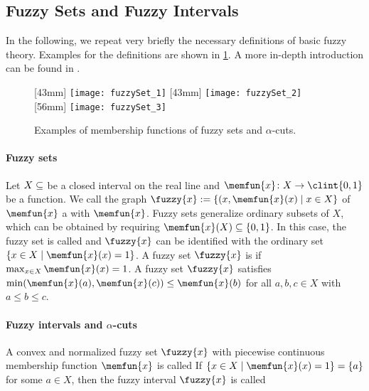 \subsection{Fuzzy Sets and Fuzzy Intervals}
\label{sec:551fuzzySets}

In the following, we repeat very briefly the necessary
definitions of basic fuzzy theory.
Examples for the definitions are shown in \cref{fig:fuzzySet}.
A more in-depth introduction can be found in
.

\begin{figure}
  [43mm]{%
    \texttt{[image: fuzzySet\_1]}%
  }%
  \hfill%
  [43mm]{%
    \texttt{[image: fuzzySet\_2]}%
  }%
  \hfill%
  [56mm]{%
    \texttt{[image: fuzzySet\_3]}%
  }%
  \caption[%
    Examples of fuzzy sets and $\alpha$-cuts%
  ]{%
    Examples of membership functions of fuzzy sets and $\alpha$-cuts.%
  }%
  \label{fig:fuzzySet}%
\end{figure}

\paragraph{Fuzzy sets}

Let $X \subset \real$ be a closed interval on the real line
and $\memfun{x}\colon X \to \clint{0, 1}$ be a function.
We call the graph $\fuzzy{x} := \{(x, \memfun{x}(x) \mid x \in X\}$
of $\memfun{x}$ a  with
 $\memfun{x}$.
Fuzzy sets generalize ordinary subsets of $X$,
which can be obtained by requiring $\memfun{x}(X) \subset \{0, 1\}$.
In this case, the fuzzy set is called  and
$\fuzzy{x}$ can be identified with the ordinary set
$\{x \in X \mid \memfun{x}(x) = 1\}$.
A fuzzy set $\fuzzy{x}$ is 
if $\max_{x \in X} \memfun{x}(x) = 1$.
A  fuzzy set $\fuzzy{x}$ satisfies
$\min(\memfun{x}(a), \memfun{x}(c)) \le \memfun{x}(b)$ for all $a, b, c \in X$
with $a \le b \le c$.

\paragraph{Fuzzy intervals and $\alpha$-cuts}

A convex and normalized fuzzy set $\fuzzy{x}$ with
piecewise continuous membership function $\memfun{x}$ is called
If $\{x \in X \mid \memfun{x}(x) = 1\} = \{a\}$ for some $a \in X$,
then the fuzzy interval $\fuzzy{x}$ is called 


